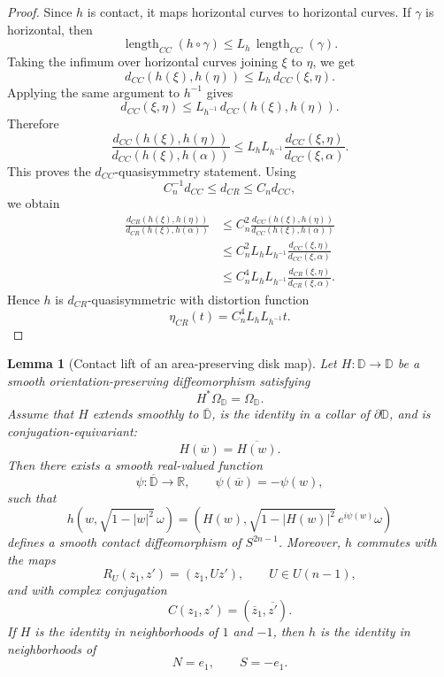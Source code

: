 \documentclass[11pt]{article}
\newtheorem{lemma}[theorem]{Lemma}
\theoremstyle{definition}
\theoremstyle{remark}
\theoremstyle{definition}
\newcommand{\D}{\mathbb D}
\newcommand{\R}{\mathbb R}
\begin{document}
\begin{proof}
Since \(h\) is contact, it maps horizontal curves to horizontal curves.  If
\(\gamma\) is horizontal, then
\[
        \operatorname{length}_{CC}(h\circ\gamma)
        \le
        L_h\,\operatorname{length}_{CC}(\gamma).
\]
Taking the infimum over horizontal curves joining \(\xi\) to \(\eta\), we get
\[
        d_{CC}(h(\xi),h(\eta))
        \le
        L_h\,d_{CC}(\xi,\eta).
\]
Applying the same argument to \(h^{-1}\) gives
\[
        d_{CC}(\xi,\eta)
        \le
        L_{h^{-1}}\,d_{CC}(h(\xi),h(\eta)).
\]
Therefore
\[
        \frac{d_{CC}(h(\xi),h(\eta))}
             {d_{CC}(h(\xi),h(\alpha))}
        \le
        L_hL_{h^{-1}}
        \frac{d_{CC}(\xi,\eta)}
             {d_{CC}(\xi,\alpha)}.
\]
This proves the \(d_{CC}\)-quasisymmetry statement.  Using
\[
        C_n^{-1}d_{CC}\le d_{CR}\le C_n d_{CC},
\]
we obtain
\[
\begin{aligned}
        \frac{d_{CR}(h(\xi),h(\eta))}
             {d_{CR}(h(\xi),h(\alpha))}
        &\le
        C_n^2
        \frac{d_{CC}(h(\xi),h(\eta))}
             {d_{CC}(h(\xi),h(\alpha))}       \\
        &\le
        C_n^2 L_hL_{h^{-1}}
        \frac{d_{CC}(\xi,\eta)}
             {d_{CC}(\xi,\alpha)}             \\
        &\le
        C_n^4L_hL_{h^{-1}}
        \frac{d_{CR}(\xi,\eta)}
             {d_{CR}(\xi,\alpha)}.
\end{aligned}
\]
Hence \(h\) is \(d_{CR}\)-quasisymmetric with distortion function
\[
        \eta_{CR}(t)=C_n^4L_hL_{h^{-1}}t.
\]
\end{proof}

\begin{lemma}[Contact lift of an area-preserving disk map]
\label{lemma-contact-lift}
Let \(H:\D\to\D\) be a smooth orientation-preserving diffeomorphism satisfying
\[
        H^*\Omega_{\D}=\Omega_{\D}.
\]
Assume that \(H\) extends smoothly to \(\overline{\D}\), is the identity in a
collar of \(\partial\D\), and is conjugation-equivariant:
\[
        H(\overline w)=\overline{H(w)}.
\]
Then there exists a smooth real-valued function
\[
        \psi:\overline{\D}\to\R,
        \qquad
        \psi(\overline w)=-\psi(w),
\]
such that
\[
        h(w,\sqrt{1-|w|^2}\,\omega)
        =
        \left(
        H(w),
        \sqrt{1-|H(w)|^2}\,e^{i\psi(w)}\omega
        \right)
\]
defines a smooth contact diffeomorphism of \(S^{2n-1}\).  Moreover, \(h\)
commutes with the maps
\[
        R_U(z_1,z')=(z_1,Uz'),
        \qquad U\in U(n-1),
\]
and with complex conjugation
\[
        C(z_1,z')=(\overline z_1,\overline{z'}).
\]
If \(H\) is the identity in neighborhoods of \(1\) and \(-1\), then \(h\) is
the identity in neighborhoods of
\[
        N=e_1,
        \qquad
        S=-e_1.
\]
\end{lemma}
\end{document}
